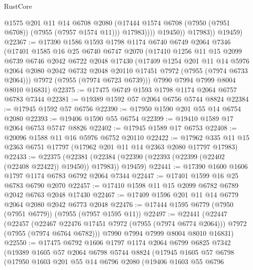 \begin{lexlean}{RustCore}
\begin{coremodule}
                      @1575
                      @201
                      @11
                      @14
                      @6708
                      @2080
                      (@17444 @1574 @6708 (@7950 (@7951 @6708)) (@7955 (@7957 @1574 @11)))
                      @17983))))
              @19450))
          @17983))
      @19459)
@22367 := @17390
    @1586
    @1593
    @1798
    @1174
    @6740
    @6749
    @2064
    @7346
    (@17401
      @1585
      @16
      @25
      @6740
      @6747
      @2070
      (@17410
        @1256
        @11
        @15
        @2099
        @6739
        @6746
        @2042
        @6722
        @2048
        @17430
        (@17409
          @1254
          @201
          @11
          @14
          @5976
          @2064
          @2080
          @2042
          @6732
          @2048
          @20110
          @17451
          @7972
          (@7955 (@7974 @6733 @2064)))
        @7972
        (@7955 (@7974 @6723 @6739)))
      @7990
      @7994
      @7999
      @8004
      @8010
      @16831)
@22375 := @17475 @6749 @1593 @1798 @1174 @2064 @6757 @6783 @7344
@22381 := @19389 @1592 @57 @2064 @6756 @5744 @8824
@22384 := @17945 @1592 @57 @6756
@22390 := @17950 @1590 @201 @55 @14 @6754 @2080
@22393 := @19406 @1590 @55 @6754
@22399 := @19410 @1589 @17 @2064 @6753 @5747 @8826
@22402 := @17945 @1589 @17 @6753
@22408 := @20096 @1588 @11 @16 @5976 @6752 @20110
@22422 := @17962 @335 @11 @15 @2363 @6751 @17797 (@17962 @201 @11 @14 @2363 @2080 @17797 @17983)
@22433 := @22375
    (@22381 (@22384 (@22390 (@22393 (@22399 (@22402 (@22408 @22422)) @19450)) @17983)) @19459)
@22441 := @17390 @1600 @1606 @1797 @1174 @6783 @6792 @2064 @7344
@22447 := @17401 @1599 @16 @25 @6783 @6790 @2070
@22457 := @17410 @1598 @11 @15 @2099 @6782 @6789 @2042 @6763 @2048 @17430
@22467 := @17409 @1596 @201 @11 @14 @6779 @2064 @2080 @2042 @6773 @2048
@22476 := @17444 @1595 @6779 (@7950 (@7951 @6779)) (@7955 (@7957 @1595 @11))
@22497 := @22441
    (@22447
      (@22457
        (@22467 @22476 @17451 @7972 (@7955 (@7974 @6774 @2064)))
        @7972
        (@7955 (@7974 @6764 @6782)))
      @7990
      @7994
      @7999
      @8004
      @8010
      @16831)
@22550 := @17475
    @6792
    @1606
    @1797
    @1174
    @2064
    @6799
    @6825
    @7342
    (@19389
      @1605
      @57
      @2064
      @6798
      @5744
      @8824
      (@17945
        @1605
        @57
        @6798
        (@17950
          @1603
          @201
          @55
          @14
          @6796
          @2080
          (@19406
            @1603
            @55
            @6796

\end{coremodule}
\end{lexlean}
